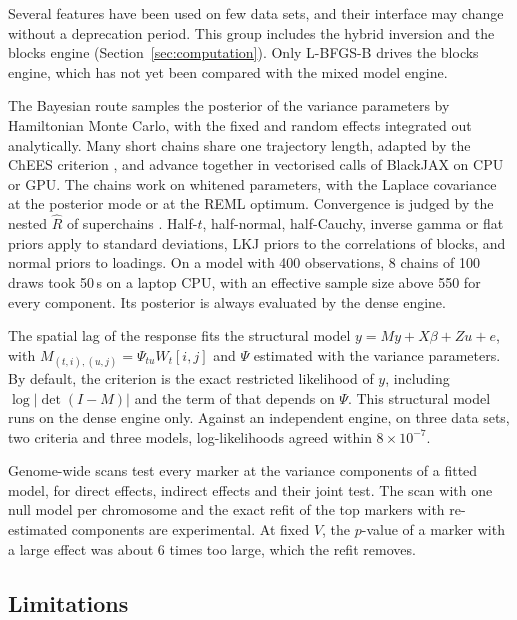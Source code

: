 \documentclass[article,nojss]{jss}
\renewcommand{\pkg}[1]{#1}
\begin{document}
Several features have been used on few data sets, and their interface may
change without a deprecation period. This group includes the hybrid
inversion and the blocks engine (Section~\ref{sec:computation}). Only
L-BFGS-B drives the blocks engine, which has not yet been compared with the
mixed model engine.

The Bayesian route samples the posterior of the variance parameters by
Hamiltonian Monte Carlo, with the fixed and random effects integrated out
analytically. Many short chains share one trajectory length, adapted by the
ChEES criterion \citep{hoffman2021}, and advance together in vectorised calls
of \pkg{BlackJAX} \citep{cabezas2024} on CPU or GPU. The chains work on
whitened parameters, with the Laplace covariance at the posterior mode or at
the REML optimum. Convergence is judged by the nested $\hat R$ of
superchains \citep{margossian2024}. Half-$t$, half-normal, half-Cauchy,
inverse gamma or flat priors apply to standard deviations, LKJ priors to the
correlations of  blocks, and normal priors to loadings. On a model with
400 observations, 8 chains of 100 draws took 50\,s on a laptop CPU, with an
effective sample size above 550 for every component. Its posterior is always
evaluated by the dense engine.

The spatial lag of the response fits the structural model $y = My + X\beta +
Zu + e$, with $M_{(t,i),(u,j)} = \Psi_{tu} W_t[i,j]$ and $\Psi$ estimated with
the variance parameters. By default, the criterion is the exact restricted
likelihood of $y$, including $\log|\det(I - M)|$ and the term of
\citet{harville1977} that depends on $\Psi$. This structural model runs on
the dense engine only. Against an independent engine, on three data sets, two criteria and
three models, log-likelihoods agreed within $8 \times 10^{-7}$.

Genome-wide scans test every marker at the variance components of a fitted
model, for direct effects, indirect effects and their joint test. The scan
with one null model per chromosome and the exact refit of the top markers with
re-estimated components are experimental. At fixed $V$, the $p$-value of a
marker with a large effect was about 6 times too large, which the refit
removes.

\subsection{Limitations}
\end{document}
